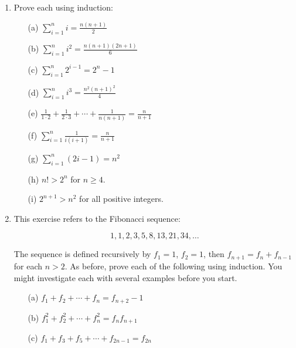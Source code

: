 \documentclass[11pt,paper=b5,footinclude,headinclude]{scrbook} %
\theoremstyle{remark}
\theoremstyle{definition} %
\theoremstyle{theorem} %
\begin{document}
\begin{enumerate}[resume, label=\textbf{Problem \arabic*.}]
    \item Prove each using induction:
    \begin{enumerate}
        \item[(a)] $\sum_{i=1}^n i = \frac{n(n + 1)}{2}$
        \item[(b)] $\sum_{i=1}^n i^2 = \frac{n(n + 1)(2n + 1)}{6}$
        \item[(c)] $\sum_{i=1}^n 2^{i-1} = 2^n - 1$
        \item[(d)] $\sum_{i=1}^n i^3 = \frac{n^2(n + 1)^2}{4}$
        \item[(e)] $\frac{1}{1 \cdot 2} + \frac{1}{2 \cdot 3} + \cdots + \frac{1}{n(n + 1)} = \frac{n}{n + 1}$
        \item[(f)] $\sum_{i=1}^n \frac{1}{i(i + 1)} = \frac{n}{n + 1}$
        \item[(g)] $\sum_{i=1}^n (2i - 1) = n^2$
        \item[(h)] $n! > 2^n$ for $n \geq 4$.
        \item[(i)] $2^{n+1} > n^2$ for all positive integers.
    \end{enumerate}
    \item This exercise refers to the Fibonacci sequence:

\[
1, 1, 2, 3, 5, 8, 13, 21, 34, \ldots
\]

The sequence is defined recursively by $f_1 = 1$, $f_2 = 1$, then $f_{n+1} = f_n + f_{n-1}$ for each $n > 2$. As before, prove each of the following using induction. You might investigate each with several examples before you start.
    \begin{enumerate}
        \item[(a)] $f_1 + f_2 + \cdots + f_n = f_{n+2} - 1$
        \item[(b)] $f_1^2 + f_2^2 + \cdots + f_n^2 = f_n f_{n+1}$
        \item[(c)] $f_1 + f_3 + f_5 + \cdots + f_{2n-1} = f_{2n}$
    \end{enumerate}
\end{enumerate}
\end{document}
